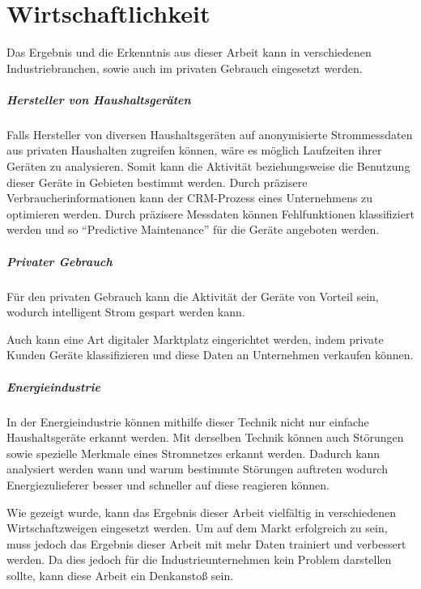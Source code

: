 \chapter{Wirtschaftlichkeit}
    Das Ergebnis und die Erkenntnis aus dieser Arbeit kann in verschiedenen Industriebranchen, sowie auch im privaten Gebrauch eingesetzt werden.

    \paragraph{Hersteller von Haushaltsgeräten}
    Falls Hersteller von diversen Haushaltsgeräten auf anonymisierte Strommessdaten aus privaten Haushalten zugreifen können, wäre es möglich Laufzeiten ihrer Geräten zu analysieren.
    Somit kann die Aktivität beziehungsweise die Benutzung dieser Geräte in Gebieten bestimmt werden. 
    Durch präzisere Verbraucherinformationen kann der \ac{CRM}-Prozess eines Unternehmens zu optimieren werden.
    Durch präzisere Messdaten können Fehlfunktionen klassifiziert werden und so "`Predictive Maintenance"' für die Geräte angeboten werden.

    \paragraph{Privater Gebrauch}
    Für den privaten Gebrauch kann die Aktivität der Geräte von Vorteil sein, wodurch intelligent Strom gespart werden kann.
    
    Auch kann eine Art digitaler Marktplatz eingerichtet werden, indem private Kunden Geräte klassifizieren und diese Daten an Unternehmen verkaufen können.

    \paragraph{Energieindustrie}
    In der Energieindustrie können mithilfe dieser Technik nicht nur einfache Haushaltsgeräte erkannt werden. 
    Mit derselben Technik können auch Störungen sowie spezielle Merkmale eines Stromnetzes erkannt werden. 
    Dadurch kann analysiert werden wann und warum bestimmte Störungen auftreten wodurch Energiezulieferer besser und schneller auf diese reagieren können.
    \newline

    Wie gezeigt wurde, kann das Ergebnis dieser Arbeit vielfältig in verschiedenen Wirtschaftzweigen eingesetzt werden.
    Um auf dem Markt erfolgreich zu sein, muss jedoch das Ergebnis dieser Arbeit mit mehr Daten trainiert und verbessert werden.
    Da dies jedoch für die Industrieunternehmen kein Problem darstellen sollte, kann diese Arbeit ein Denkanstoß sein.